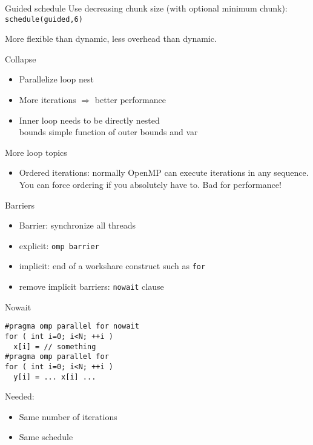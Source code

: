 \begin{numberedframe}{Guided schedule}
  Use decreasing chunk size (with optional minimum
  chunk): \texttt{schedule(guided,6)}

  More flexible than dynamic, less overhead than dynamic.    
\end{numberedframe}

\begin{numberedframe}{Collapse}
  \begin{itemize}
  \item Parallelize loop nest
  \item More iterations $\Rightarrow$ better performance
  \item Inner loop needs to be directly nested\\
    bounds simple function of outer bounds and var
  \end{itemize}
\end{numberedframe}

\begin{numberedframe}{More loop topics}
  \begin{itemize}
  \item Ordered iterations: normally OpenMP can execute iterations in
    any sequence. You can force ordering if you absolutely have
    to. Bad for performance!
  \end{itemize}
\end{numberedframe}

\begin{numberedframe}{Barriers}
  \begin{itemize}
  \item Barrier: synchronize all threads
  \item explicit: \lstinline{omp barrier}
  \item implicit: end of a workshare construct such as \lstinline{for}
  \item remove implicit barriers: \lstinline{nowait} clause
  \end{itemize}
\end{numberedframe}

\begin{numberedframe}{Nowait}
\begin{lstlisting}
#pragma omp parallel for nowait
for ( int i=0; i<N; ++i )
  x[i] = // something
#pragma omp parallel for
for ( int i=0; i<N; ++i )
  y[i] = ... x[i] ...
\end{lstlisting}
Needed:
  \begin{itemize}
  \item Same number of iterations
  \item Same schedule
  \end{itemize}
\end{numberedframe}

